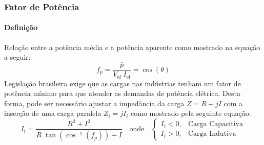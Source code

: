 \documentclass{article}
\begin{document}
            \subsubsection{Fator de Potência}
                \paragraph{Definição}Relação entre a potência média e a potência aparente como mostrado na equação a seguir:
                    \begin{equation}
                        \boxed{
                            f_{p} = \frac{\bar{p}}{V_{\text{ef}}\;I_{\text{ef}}} = \cos(\theta)
                        }
                    \end{equation}
                Legislação brasileira exige que as cargas nas indústrias tenham um fator de potência mínimo para que atender as demandas de potência elétrica. Desta forma, pode ser necessário ajustar a impedância da carga $Z = R + jI$ com a inserção de uma carga paralela $Z_{i} = j I_{i}$ como mostrado pela seguinte equação:
                    \begin{equation}
                        \boxed{
                            I_{i} = \frac{R^2 + I^2}{R\;\tan(\cos^{-1}(f_{p})) - I}
                        }
                        \quad
                        \text{onde}
                        \quad
                        \begin{cases}
                            I_{i} < 0, & \text{Carga Capacitiva}\\
                            I_{i} > 0, & \text{Carga Indutiva}
                        \end{cases}
                    \end{equation}
\end{document}

